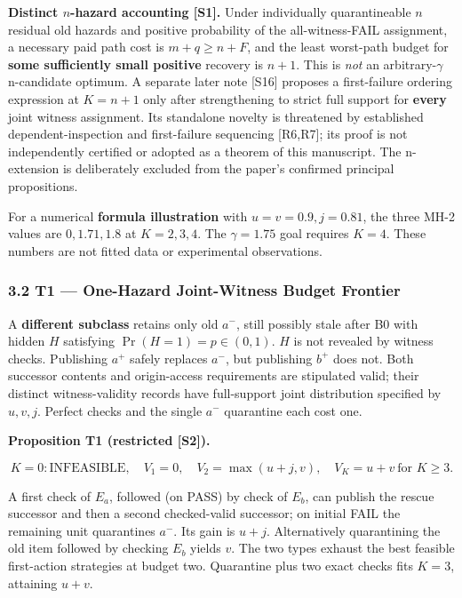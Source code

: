 \documentclass[
  10pt,
  american,
  a4paper,
]{article}
\begin{document}
\textbf{Distinct \(n\)-hazard accounting {[}S1{]}.} Under individually
quarantineable \(n\) residual old hazards and positive probability of
the all-witness-FAIL assignment, a necessary paid path cost is
\(m+q\ge n+F\), and the least worst-path budget for \textbf{some
sufficiently small positive} recovery is \(n+1\). This is \emph{not} an
arbitrary-\(\gamma\) n-candidate optimum. A separate later note
{[}S16{]} proposes a first-failure ordering expression at \(K=n+1\) only
after strengthening to strict full support for \textbf{every} joint
witness assignment. Its standalone novelty is threatened by established
dependent-inspection and first-failure sequencing {[}R6,R7{]}; its proof
is not independently certified or adopted as a theorem of this
manuscript. The n-extension is deliberately excluded from the paper's
confirmed principal propositions.

For a numerical \textbf{formula illustration} with \(u=v=0.9,j=0.81\),
the three MH-2 values are \(0,1.71,1.8\) at \(K=2,3,4\). The
\(\gamma=1.75\) goal requires \(K=4\). These numbers are not fitted data
or experimental observations.

\hypertarget{t1-one-hazard-joint-witness-budget-frontier}{%
\subsubsection{3.2 T1 --- One-Hazard Joint-Witness Budget
Frontier}\label{t1-one-hazard-joint-witness-budget-frontier}}

A \textbf{different subclass} retains only old \(a^-\), still possibly
stale after B0 with hidden \(H\) satisfying \(\Pr(H=1)=p\in(0,1)\).
\(H\) is not revealed by witness checks. Publishing \(a^+\) safely
replaces \(a^-\), but publishing \(b^+\) does not. Both successor
contents and origin-access requirements are stipulated valid; their
distinct witness-validity records have full-support joint distribution
specified by \(u,v,j\). Perfect checks and the single \(a^-\) quarantine
each cost one.

\textbf{Proposition T1 (restricted {[}S2{]}).}

\[
K=0:\mathrm{INFEASIBLE},\quad V_1=0,\quad
V_2=\max(u+j,v),\quad V_K=u+v\ \text{for }K\ge3.
\]

A first check of \(E_a\), followed (on PASS) by check of \(E_b\), can
publish the rescue successor and then a second checked-valid successor;
on initial FAIL the remaining unit quarantines \(a^-\). Its gain is
\(u+j\). Alternatively quarantining the old item followed by checking
\(E_b\) yields \(v\). The two types exhaust the best feasible
first-action strategies at budget two. Quarantine plus two exact checks
fits \(K=3\), attaining \(u+v\).
\end{document}
